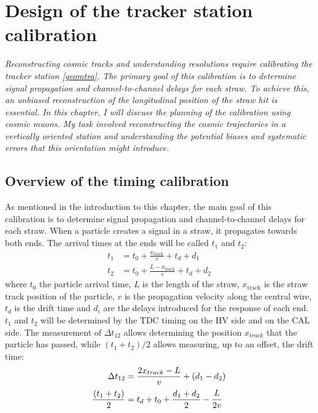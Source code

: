\chapter{Design of the tracker station calibration}\label{planning}
\textit{Reconstructing cosmic tracks and understanding resolutions require 
calibrating the tracker station \ref{geomtra}. 
The primary goal of this calibration is to determine signal propagation and 
channel-to-channel delays for each straw. To achieve this, an unbiased 
reconstruction of the longitudinal position of the straw 
hit is essential. In this chapter, I will discuss the planning 
of the calibration using cosmic muons. My task 
involved reconstructing the cosmic trajectories in a vertically 
oriented station and understanding the potential 
biases and systematic errors that this orientation might introduce.}
\section{Overview of the timing calibration}
As mentioned in the introduction to this chapter, the main goal of this calibration is to determine signal propagation and channel-to-channel delays for each straw.
When a particle creates a signal in a straw, it propagates towards both ends. 
The arrival times at the ends will be called $t_1$ and $t_2$:
\begin{equation}
\begin{aligned}
    t_1 &= t_0 + \frac{x_{\text{track}}}{v} + t_d + d_1 \\
    t_2 &= t_0 + \frac{L - x_{\text{track}}}{v} + t_d + d_2
\end{aligned}
\end{equation}
where $t_0$ the particle arrival time, $L$ is the length of the straw, $x_{\text{track}}$ is the straw track position 
of the particle, $v$ is the propagation velocity along the central wire,  $t_d$ is the drift time and $d_i$ 
are the delays introduced for the response of each end. $t_1$ and $t_2$ will be determined by the TDC timing on the HV side and on the CAL side.
The measurement of $\Delta t_{12}$ allows determining the position $x_{track}$ that the particle has passed, 
while $(t_1 + t_2) / 2$ allows measuring, up to an offset, the drift time:
\begin{equation}\label{ffffff}
    \begin{aligned}
        \Delta t_{12} &= \frac{2x_{track}-L}{v} +(d_1-d_2)  \\
        \frac{(t_1 + t_2)}{2} &= t_d+t_0+\frac{d_1+d_2}{2}-\cfrac{L}{2v} 
    \end{aligned}
    \end{equation}
